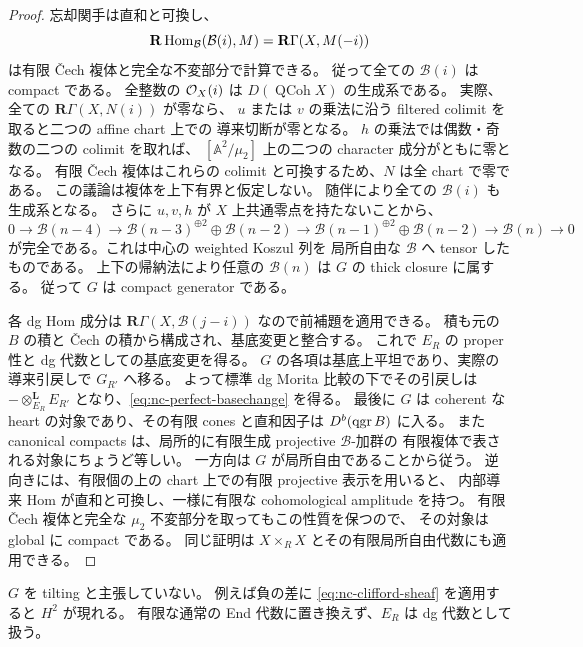 \begin{proof}
忘却関手は直和と可換し、
\[
 \mathbf R\operatorname{Hom}_{\mathcal B}(\mathcal B(i),M)
 =\mathbf R\Gamma(X,M(-i))
\]
は有限 \v{C}ech 複体と完全な不変部分で計算できる。
従って全ての $\mathcal B(i)$ は compact である。
全整数の $\mathcal O_X(i)$ は $D(\operatorname{QCoh} X)$ の生成系である。
実際、全ての $\mathbf R\Gamma(X,N(i))$ が零なら、
$u$ または $v$ の乗法に沿う filtered colimit を取ると二つの affine chart 上での
導来切断が零となる。
$h$ の乗法では偶数・奇数の二つの colimit を取れば、
$[\mathbb A^2/\mu_2]$ 上の二つの character 成分がともに零となる。
有限 \v{C}ech 複体はこれらの colimit と可換するため、$N$ は全 chart で零である。
この議論は複体を上下有界と仮定しない。
随伴により全ての $\mathcal B(i)$ も生成系となる。
さらに $u,v,h$ が $X$ 上共通零点を持たないことから、
\[
 0\to\mathcal B(n-4)\to
 \mathcal B(n-3)^{\oplus2}\oplus\mathcal B(n-2)\to
 \mathcal B(n-1)^{\oplus2}\oplus\mathcal B(n-2)\to
 \mathcal B(n)\to0
 \tag{NCF-4}\label{eq:nc-weighted-koszul}
\]
が完全である。これは中心の weighted Koszul 列を
局所自由な $\mathcal B$ へ tensor したものである。
上下の帰納法により任意の $\mathcal B(n)$ は $G$ の thick closure に属する。
従って $G$ は compact generator である。

各 dg Hom 成分は
$\mathbf R\Gamma(X,\mathcal B(j-i))$ なので前補題を適用できる。
積も元の $B$ の積と \v{C}ech の積から構成され、基底変更と整合する。
これで $E_R$ の proper 性と dg 代数としての基底変更を得る。
$G$ の各項は基底上平坦であり、実際の導来引戻しで $G_{R'}$ へ移る。
よって標準 dg Morita 比較の下でその引戻しは
$-\otimes_{E_R}^{\mathbf L}E_{R'}$ となり、\eqref{eq:nc-perfect-basechange} を得る。
最後に $G$ は coherent な heart の対象であり、その有限 cones と直和因子は
$D^b(\operatorname{qgr} B)$ に入る。
また canonical compacts は、局所的に有限生成 projective $\mathcal B$-加群の
有限複体で表される対象にちょうど等しい。
一方向は $G$ が局所自由であることから従う。
逆向きには、有限個の上の chart 上での有限 projective 表示を用いると、
内部導来 Hom が直和と可換し、一様に有限な cohomological amplitude を持つ。
有限 \v{C}ech 複体と完全な $\mu_2$ 不変部分を取ってもこの性質を保つので、
その対象は global に compact である。
同じ証明は $X\times_R X$ とその有限局所自由代数にも適用できる。
\end{proof}

\begin{remark}
$G$ を tilting と主張していない。
例えば負の差に \eqref{eq:nc-clifford-sheaf} を適用すると $H^2$ が現れる。
有限な通常の End 代数に置き換えず、$E_R$ は dg 代数として扱う。
\end{remark}

